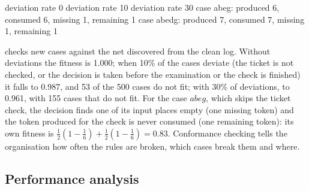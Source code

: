 \begin{pyoutput}
deviation rate 0%
deviation rate 10%
deviation rate 30%
case abeg: produced 6, consumed 6, missing 1, remaining 1
case abedg: produced 7, consumed 7, missing 1, remaining 1
\end{pyoutput}

 checks new cases against the net discovered from the clean log. Without deviations
the fitness is 1.000; when 10\% of the cases deviate (the ticket is not checked, or the decision is taken
before the examination or the check is finished) it falls to 0.987, and 53 of the 500 cases do not fit;
with 30\% of deviations, to 0.961, with 155 cases that do not fit. For the case $abeg$, which skips the
ticket check, the decision finds one of its input places empty (one missing token) and the token produced
for the check is never consumed (one remaining token): its own fitness is
$\frac12(1-\frac16)+\frac12(1-\frac16)=0.83$. Conformance checking tells the organisation how
often the rules are broken, which cases break them and where.

\subsection{Performance analysis}


